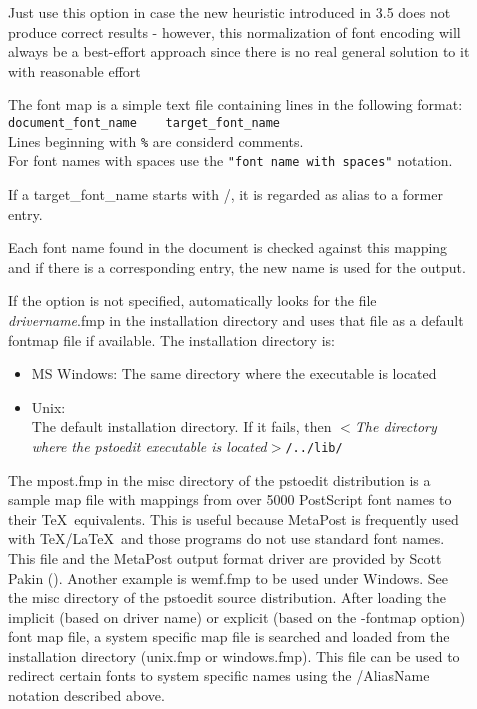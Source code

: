 \documentclass[english,a4paper]{article}
\begin{document}
\begin{description}
\item[]
Just use this option in case the new heuristic introduced in 3.5 does not produce correct results - however, this normalization of font encoding will always be a best-effort approach since there is no real general solution to it with reasonable effort


\item[]
The font map is a simple text file containing lines in the following format:\\


\verb+document_font_name    target_font_name+\\
Lines beginning with \verb+%+ are considerd comments.\\
For font names with spaces use the \verb+"font name with spaces"+ notation.

If a target\_font\_name starts with /, it is regarded as alias to a former entry.
 
Each font name found in the document is checked against this mapping and if there is a corresponding entry, the new name is used for the output. 

If  the  option is not specified,  automatically looks for the file \emph{drivername}.fmp in the installation directory and uses that file as a default fontmap file if available. The installation directory is:

\begin{itemize}

  \item MS Windows: The same directory where the  executable is located

  \item Unix:\\
  The default installation directory. If it fails, then $<$\emph{The directory where the pstoedit executable is located}$>$\verb+/../lib/+

\end{itemize}

The mpost.fmp in the misc directory of the pstoedit distribution is a sample map file with mappings from over 5000 PostScript font names to their \TeX\ equivalents. This is useful because MetaPost is frequently used with \TeX/\LaTeX\ and those programs do not use standard font names. This file and the MetaPost output format driver are provided by Scott Pakin ().
Another example is wemf.fmp to be used under Windows. See the misc directory of the pstoedit source distribution.
After loading the implicit (based on driver name) or explicit (based on the -fontmap option) font map file, a system specific map file is searched and loaded from the installation directory (unix.fmp or windows.fmp). This file can be used to redirect certain fonts to system specific names using the /AliasName notation described above.


\end{description}
\end{document}
